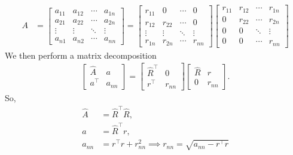 \documentclass{report}
\begin{document}
\begin{itemize}
\begin{align*}
                        A &= \begin{bmatrix} a_{11} & a_{12} & \cdots & a_{1n} \\ a_{21} & a_{22} & \cdots & a_{2n} \\ \vdots & \vdots & \ddots & \vdots \\ a_{n1} & a_{n2} & \cdots & a_{nn} \end{bmatrix} = 
                \begin{bmatrix}
                    r_{11} & 0  & \cdots & 0\\
                    r_{12} & r_{22}  &  \cdots & 0 \\
                    \vdots & \vdots & \ddots & \vdots\\
                    r_{1n} & r_{2n} & \cdots & r_{nn}
                \end{bmatrix}
                \begin{bmatrix}
                    r_{11} & r_{12} & \cdots & r_{1n} \\
                    0 & r_{22} & \cdots & r_{2n} \\
                    0 & 0 & \ddots & \vdots \\
                    0 & 0  & \cdots & r_{nn}
                \end{bmatrix}
            \end{align*}
        We then perform a matrix decomposition 
        \begin{align*}
            \begin{bmatrix}
                \hat{A} & a \\
                a^{\top} & a_{nn}
            \end{bmatrix}
             =
             \begin{bmatrix}
                 \hat{R}^{\top} & 0 \\
                 r^{\top} & r_{nn}
             \end{bmatrix}
             \begin{bmatrix}
                 \hat{R} & r \\
                 0 & r_{nn}
             \end{bmatrix}
        .\end{align*}
        So, 
        \begin{align*}
            \hat{A} &= \hat{R}^{\top}\hat{R}, \\
            a &= \hat{R}^{\top}r, \\
            a_{nn} &= r^{\top}r + r_{nn}^{2} \implies r_{nn} = \sqrt{a_{nn} - r^{\top}r}

\end{align*}
\end{itemize}
\end{document}

